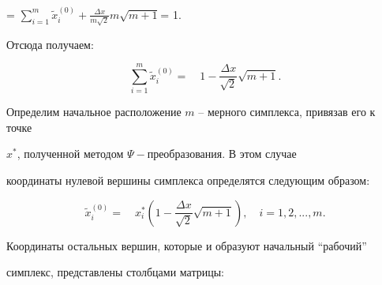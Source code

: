 \documentclass [12pt]{article}
\begin{document}
\begin{center}

= $\sum\limits_{i = 1}^m {\tilde {x}_i^{(0)} }  + \frac{\Delta x}{m\sqrt 2 

}m\sqrt {m + 1} _{ }$= 1.

\end{center}



Отсюда получаем: 





\[

\sum\limits_{i = 1}^m {\tilde {x}_i^{(0)} } = 

\quad

1 - \frac{\Delta x}{\sqrt 2 }\sqrt {m + 1} .

\]







Определим начальное расположение $m$ -- мерного симплекса, привязав его к точке 

$x^\ast $, полученной методом $\Psi - $преобразования. В этом случае 

координаты нулевой вершины симплекса определятся следующим образом:





\[

\tilde {x}_i^{(0)} = 

\quad

x_i^\ast \left( {1 - \frac{\Delta x}{\sqrt 2 }\sqrt {m + 1} } \right),

\quad

i = 1,2,...,m.

\]







Координаты остальных вершин, которые и образуют начальный ``рабочий'' 

симплекс, представлены столбцами матрицы:
\end{document}

